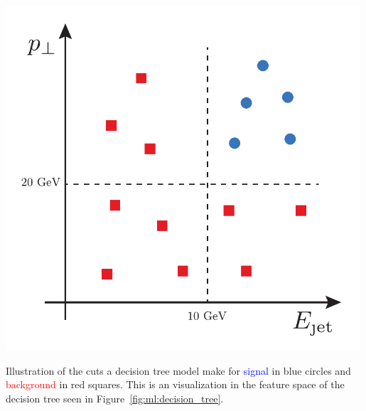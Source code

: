 \begin{marginfigure}[-3cm]
  \includegraphics[width=0.99\textwidth, trim=10 10 10 10, clip]{figures/decision_tree/tree_example.pdf}%
  \caption[Decision Tree Cuts In Feature Space]{Illustration of the cuts a decision tree model make for \textcolor{blue}{signal} in blue circles and \textcolor{red}{background} in red squares. This is an visualization in the feature space of the decision tree seen in Figure~\ref{fig:ml:decision_tree}.}
  \label{fig:ml:decision_tree_feature_space}
\end{marginfigure}

